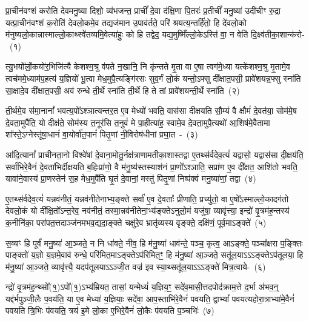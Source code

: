 \label{sec:startkanda6}
\setcounter{anuvakam}{0}
प्रा॒चीन॑वꣳशं करोति देवमनु॒ष्या दिशो॒ व्य॑भजन्त॒ प्राचीं᳚ दे॒वा द॑क्षि॒णा पि॒तरः॑ प्र॒तीचीं᳚ मनु॒ष्या॑ उदी॑चीꣳ रु॒द्रा यत्प्रा॒चीन॑वꣳशं क॒रोति॑ देवलो॒कमे॒व तद्यज॑मान उ॒पाव॑र्तते॒ परि॑ श्रयत्य॒न्तर्\mbox{}हि॑तो॒ हि दे॑वलो॒को म॑नुष्यलो॒का\-न्नास्माल्लो॒काथ्स्वे॑तव्यमि॒वेत्या॑हुः॒ को हि तद्वेद॒ यद्य॒मुष्मिँ॑ल्लो॒के\-ऽस्ति॑ वा॒ न वेति॑ दि॒क्ष्व॑तीका॒शान्क॑रो-~(१)\ip

त्यु॒भयो᳚र्लो॒कयो॑र॒भिजि॑त्यै केशश्म॒श्रु व॑पते न॒खानि॒ नि कृ॑न्तते मृ॒ता वा ए॒षा त्वग॑मे॒ध्या यत्के॑शश्म॒श्रु मृ॒तामे॒व त्वच॑ममे॒ध्याम॑प॒हत्य॑ य॒ज्ञियो॑ भू॒त्वा मेध॒मुपै॒त्यङ्गि॑रसः सुव॒र्गं लो॒कं यन्तो॒\-ऽफ्सु दी᳚क्षात॒पसी॒ प्रावे॑शयन्न॒फ्सु स्ना॑ति सा॒क्षादे॒व दी᳚क्षात॒पसी॒ अव॑ रुन्धे ती॒र्थे स्ना॑ति ती॒र्थे हि ते तां प्रावे॑शयन्ती॒र्थे स्ना॑ति~(२)\ip

ती॒र्थमे॒व स॑मा॒नानां᳚ भवत्य॒पो᳚\-ऽश्ञात्यन्तर॒त ए॒व मेध्यो॑ भवति॒ वास॑सा दीक्षयति सौ॒म्यं वै क्षौमं॑ दे॒वत॑या॒ सोम॑मे॒ष दे॒वता॒मुपै॑ति॒ यो दीक्ष॑ते॒ सोम॑स्य त॒नूर॑सि त॒नुवं॑ मे पा॒हीत्या॑ह॒ स्वामे॒व दे॒वता॒मुपै॒त्यथो॑ आ॒शिष॑मे॒वैतामा शा᳚स्ते॒\-ऽग्नेस्तू॑षा॒धानं॑ वा॒योर्वा॑त॒पानं॑ पितृ॒णां नी॒विरोष॑धीनां प्रघा॒त~-~(३)\ip

आ॑दि॒त्यानां᳚ प्राचीनता॒नो विश्वे॑षां दे॒वाना॒मोतु॒र्नक्ष॑त्राणामतीका॒शास्तद्वा ए॒तथ्स॑र्वदेव॒त्यं॑ यद्वासो॒ यद्वास॑सा दी॒क्षय॑ति॒ सर्वा॑भिरे॒वैनं॑ दे॒वता॑भिर्दीक्षयति ब॒हिःप्रा॑णो॒ वै म॑नु॒ष्य॑स्तस्याश॑नं प्रा॒णो᳚\-ऽश्ञाति॒ सप्रा॑ण ए॒व दी᳚क्षत॒ आशि॑तो भवति॒ यावा॑ने॒वास्य॑ प्रा॒णस्तेन॑ स॒ह मेध॒मुपै॑ति घृ॒तं दे॒वानां॒ मस्तु॑ पितृ॒णां निष्प॑क्वं मनु॒ष्या॑णां॒ तद्वा~(४)\ip

ए॒तथ्स॑र्वदेव॒त्यं॑ यन्नव॑नीतं॒ यन्नव॑नीतेनाभ्य॒ङ्क्ते सर्वा॑ ए॒व दे॒वताः᳚ प्रीणाति॒ प्रच्यु॑तो॒ वा ए॒षो᳚\-ऽस्माल्लो॒कादग॑तो देवलो॒कं यो दी᳚क्षि॒तो᳚\-ऽन्त॒रेव॒ नव॑नीतं॒ तस्मा॒न्नव॑नीतेना॒भ्य॑ङ्क्ते\-ऽनुलो॒मं यजु॑षा॒ व्यावृ॑त्त्या॒ इन्द्रो॑ वृ॒त्रम॑ह॒न्तस्य॑ क॒नीनि॑का॒ परा॑पत॒त्तदाञ्ज॑नमभव॒द्यदा॒ङ्क्ते चक्षु॑रे॒व भ्रातृ॑व्यस्य वृङ्क्ते॒ दक्षि॑णं॒ पूर्व॒माऽङ्क्ते॑~(५)\ip

स॒व्यꣳ हि पूर्वं॑ मनु॒ष्या॑ आ॒ञ्जते॒ न नि धा॑वते॒ नीव॒ हि म॑नु॒ष्या॑ धाव॑न्ते॒ पञ्च॒ कृत्व॒ आऽङ्क्ते॒ पञ्चा᳚क्षरा प॒ङ्क्तिः पाङ्क्तो॑ य॒ज्ञो य॒ज्ञमे॒वाव॑ रुन्धे॒ परि॑मित॒माऽङ्क्ते\-ऽप॑रिमित॒ꣳ॒ हि म॑नु॒ष्या॑ आ॒ञ्जते॒ सतू॑ल॒या\-ऽऽ\-ऽङ्क्ते\-ऽप॑तूलया॒ हि म॑नु॒ष्या॑ आ॒ञ्जते॒ व्यावृ॑त्त्यै॒ यदप॑तूलया\-ऽऽञ्जी॒त वज्र॑ इव स्या॒थ्सतू॑ल॒या\-ऽऽ\-ऽङ्क्ते॑ मित्र॒त्वाये-~(६)\ip

न्द्रो॑ वृ॒त्रम॑ह॒न्थ्सो᳚\-(१॒)ऽपो᳚\-(१॒)ऽभ्य॑म्रियत॒ तासां॒ यन्मेध्यं॑ य॒ज्ञिय॒ꣳ॒ सदे॑व॒मासी॒त्तदपोद॑\-क्राम॒त्ते द॒र्भा अ॑भव॒न्॒ यद्द॑र्भपुञ्जी॒लैः प॒वय॑ति॒ या ए॒व मेध्या॑ य॒ज्ञियाः॒ सदे॑वा॒ आप॒स्ताभि॑रे॒वैनं॑ पवयति॒ द्वा\-भ्यां᳚ पवयत्यहोरा॒त्राभ्या॑मे॒वैनं॑ पवयति त्रि॒भिः प॑वयति॒ त्रय॑ इ॒मे लो॒का ए॒भिरे॒वैनं॑ लो॒कैः प॑वयति प॒ञ्चभिः॑~(७)\ip


